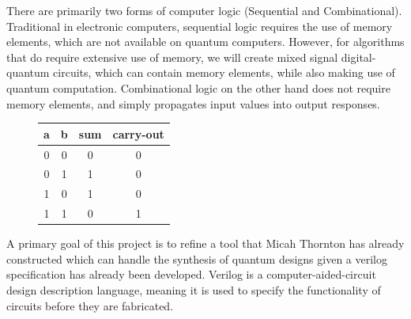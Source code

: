 There are primarily two forms of computer logic (Sequential and
Combinational). Traditional in electronic computers, sequential logic
requires the use of memory elements, which are not available on
quantum computers. However, for algorithms that do require extensive
use of memory, we will create mixed signal digital-quantum circuits,
which can contain memory elements, while also making use of quantum
computation.  Combinational logic on the other hand does not require
memory elements, and simply propagates input values into output
responses. 

\begin{figure}
  \begin{center}
    \begin{tabular}{|c|c||c|c|}
      \hline
      a & b & sum & carry-out \\
      \hline 
      0&0&0&0 \\
      0&1&1&0 \\
      1&0&1&0 \\
      1&1&0&1 \\
      \hline
    \end{tabular}
  \end{center}
\end{figure}
A primary goal of this project is to refine a tool that Micah Thornton
has already constructed which can handle the synthesis of quantum
designs given a verilog specification has already been developed.  
Verilog is a computer-aided-circuit design description language,
meaning it is used to specify the functionality of circuits before
they are fabricated.  

